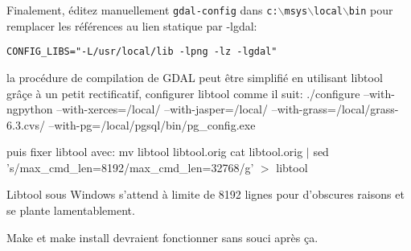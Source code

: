 % 
% 
% 
% 

Finalement, \'editez manuellement \texttt{gdal-config} dans \texttt{c:$\backslash$msys$\backslash$local$\backslash$bin} pour remplacer les r\'ef\'erences au lien statique par -lgdal:

\begin{verbatim}
CONFIG_LIBS="-L/usr/local/lib -lpng -lz -lgdal"
\end{verbatim}
la proc\'edure de compilation de GDAL peut \^etre simplifi\'e en utilisant libtool gr\^a\c{c}e \`a un petit rectificatif, configurer libtool comme il suit:
./configure --with-ngpython --with-xerces=/local/ --with-jasper=/local/
--with-grass=/local/grass-6.3.cvs/ --with-pg=/local/pgsql/bin/pg\_config.exe 

puis fixer libtool avec:
mv libtool libtool.orig
cat libtool.orig $|$ sed 's/max\_cmd\_len=8192/max\_cmd\_len=32768/g' $>$
libtool

Libtool sous Windows s'attend \`a limite de 8192 lignes pour d'obscures raisons et se plante lamentablement. 

Make et make install devraient fonctionner sans souci apr\`es \c{c}a.

% 
% 
% 

